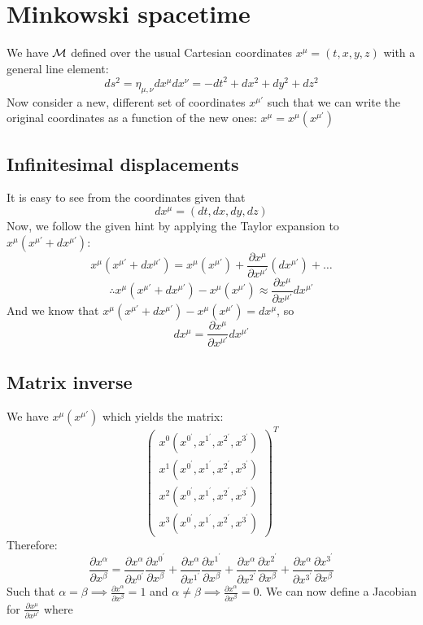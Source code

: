 \documentclass{article}
\begin{document}
	\pagebreak
	\section{Minkowski spacetime}
	We have $\mathcal{M}$ defined over the usual Cartesian coordinates $x^\mu = (t,x,y,z)$ with a general line element:
	$$ds^2 = \eta_{\mu, \nu} dx^\mu dx^\nu = -dt^2 + dx^2 + dy^2 + dz^2 $$
	Now consider a new, different set of coordinates $x^{\mu '}$ such that we can write the original coordinates as a function of the new ones: $x^\mu = x^{\mu} (x^{\mu '})$
	\subsection{Infinitesimal displacements}
	It is easy to see from the coordinates given that
	$$ dx^\mu = (dt, dx, dy, dz) $$
	Now, we follow the given hint by applying the Taylor expansion to $x^\mu (x^{\mu '} + dx^{\mu '})$:
	$$ 	x^\mu (x^{\mu '} + dx^{\mu '}) = x^\mu (x^{\mu '}) + \frac{\partial x^\mu}{\partial x^{\mu'}}(dx^{\mu'}) + \dots $$
	$$ \therefore x^{\mu} (x^{\mu '} + dx^{\mu '}) - x^\mu (x^{\mu '}) \approx \frac{\partial x^\mu}{\partial x^{\mu '}} dx^{\mu '}$$
	And we know that $ x^{\mu} (x^{\mu '} + dx^{\mu '}) - x^\mu (x^{\mu '}) = dx^\mu $, so
	$$ \boxed{dx^\mu = \frac{\partial x^\mu}{\partial x^{\mu'}} dx^{\mu '}}$$
	\subsection{Matrix inverse}
	We have $x^\mu (x^{\mu'})$ which yields the matrix:
	$$ \begin{pmatrix}
		x^{0} (x^{0^\prime} , x^{1^\prime} , x^{2^\prime},  x^{3^\prime} ) \\
		x^{1} (x^{0^\prime} , x^{1^\prime} , x^{2^\prime},  x^{3^\prime} ) \\
		x^{2} (x^{0^\prime} , x^{1^\prime} , x^{2^\prime},  x^{3^\prime} ) \\
		x^{3} (x^{0^\prime} , x^{1^\prime} , x^{2^\prime},  x^{3^\prime} ) 
	\end{pmatrix}^T $$
	Therefore:
	\begin{equation}
		\label{eq:3.1}
		\frac{\partial x^\alpha}{\partial x^\beta} = \frac{\partial x^\alpha}{\partial x^{0^\prime}}\frac{\partial x^{0^\prime}}{\partial x^\beta} + \frac{\partial x^\alpha}{\partial x^{1^\prime}}\frac{\partial x^{1^\prime}}{\partial x^\beta} + \frac{\partial x^\alpha}{\partial x^{2^\prime}}\frac{\partial x^{2^\prime}}{\partial x^\beta} + \frac{\partial x^\alpha}{\partial x^{3^\prime}}\frac{\partial x^{3^\prime}}{\partial x^\beta}
	\end{equation}
	Such that $\alpha = \beta \implies \frac{\partial x^\alpha}{\partial x^\beta} = 1$ and $\alpha \neq \beta \implies \frac{\partial x^\alpha}{\partial x^\beta} = 0$. We can now define a Jacobian for $\frac{\partial x^\mu}{\partial x^{\mu'}}$  where
	
\end{document}
